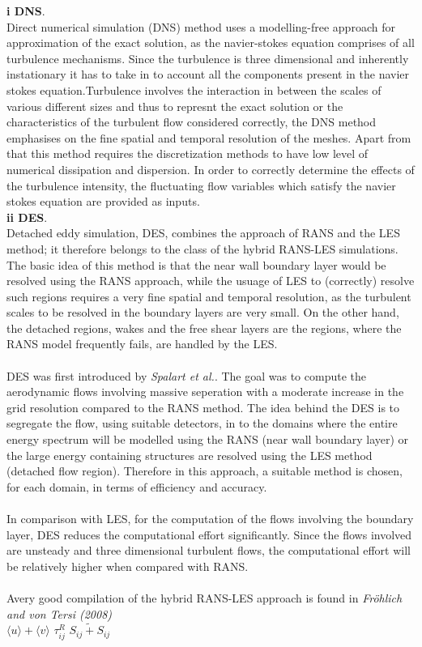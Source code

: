 \documentclass[a4paper]{article}
\def\ua{\langle{u}\rangle}
\def\va{\langle{v}\rangle}
\def\ssr{\tau^{R}_{ij}}
\def\sijf{\tilde{S_{ij} + S_{ij} }}
\begin{document}
{\bf i DNS}.\\
Direct numerical simulation (DNS) method uses a modelling-free approach for approximation of the exact solution, as the navier-stokes equation comprises of all turbulence mechanisms. Since the turbulence is three dimensional and inherently instationary it has to take in to account all the components present in the navier stokes equation.Turbulence involves the interaction in between the scales of various different sizes and thus to represnt the exact solution or the characteristics of the turbulent flow considered correctly, the DNS method emphasises on the fine spatial and temporal resolution of the meshes. Apart from that this method requires the discretization methods to have low level of numerical dissipation and dispersion. In order to correctly determine the effects of the turbulence intensity, the fluctuating flow variables which satisfy the navier stokes equation are provided as inputs.
\\
{\bf ii DES}.\\
Detached eddy simulation, DES, combines the approach of RANS and the LES method; it therefore belongs to the class of the hybrid RANS-LES simulations. The basic idea of this method is that the near wall boundary layer would be resolved using the RANS approach, while the usuage of LES to (correctly) resolve such regions requires a very fine spatial and temporal resolution, as the turbulent scales to be resolved in the boundary layers are very small. On the other hand, the detached regions, wakes and the free shear layers are the regions, where the RANS model frequently fails, are handled by the LES.\\
\\
 DES was first introduced by {\it Spalart et al.}. The goal was to compute the aerodynamic flows involving massive seperation with a moderate increase in the grid resolution compared to the RANS method. The idea behind the DES is to segregate the flow, using suitable detectors, in to the domains where the entire energy spectrum will be modelled using the RANS (near wall boundary layer) or the large energy containing structures are resolved using the LES method (detached flow region). Therefore in this approach, a suitable method is chosen, for each domain, in terms of efficiency and accuracy.\\
\\
In comparison with LES, for the computation of the flows involving the boundary layer, DES reduces the computational effort significantly. Since the flows involved are unsteady and three dimensional turbulent flows, the computational effort will be relatively higher when compared with RANS.\\
\\
Avery good compilation of the hybrid RANS-LES approach is found in {\it Fröhlich and von Tersi (2008)}\\
$\ua + \va$
$\ssr$
$\sijf$
\end{document}
